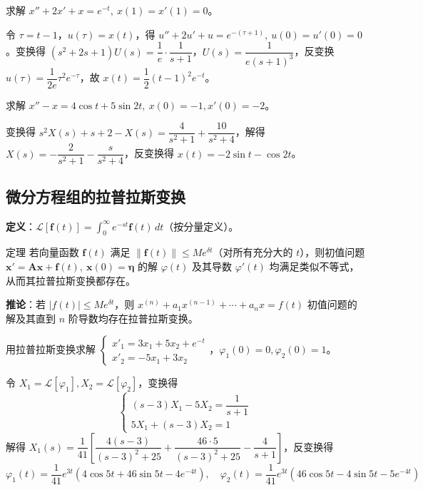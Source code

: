\begin{example}
求解 $x'' + 2x' + x = e^{-t}, \ x(1) = x'(1) = 0$。
\end{example}

\begin{solution}
令 $\tau = t - 1$，$u(\tau) = x(t)$，得 $u'' + 2u' + u = e^{-(\tau+1)}, \ u(0) = u'(0) = 0$。变换得 $(s^2+2s+1)U(s) = \dfrac{1}{e}\cdot\dfrac{1}{s+1}$，$U(s) = \dfrac{1}{e(s+1)^3}$，反变换 $u(\tau) = \dfrac{1}{2e}\tau^2e^{-\tau}$，故 $x(t) = \dfrac{1}{2}(t-1)^2e^{-t}$。
\end{solution}

\begin{example}
求解 $x'' - x = 4\cos t + 5\sin 2t, \ x(0) = -1, x'(0) = -2$。
\end{example}

\begin{solution}
变换得 $s^2X(s) + s + 2 - X(s) = \dfrac{4}{s^2+1} + \dfrac{10}{s^2+4}$，解得 $X(s) = -\dfrac{2}{s^2+1} - \dfrac{s}{s^2+4}$，反变换得 $x(t) = -2\sin t - \cos 2t$。
\end{solution}

\subsection{微分方程组的拉普拉斯变换}

\textbf{定义}：$\mathcal{L}[\mathbf{f}(t)] = \int_0^{\infty} e^{-st}\mathbf{f}(t)\,dt$（按分量定义）。

\begin{myTheorem}{定理}
若向量函数 $\mathbf{f}(t)$ 满足 $\|\mathbf{f}(t)\| \le Me^{\delta t}$（对所有充分大的 $t$），则初值问题 $\mathbf{x}' = \mathbf{A}\mathbf{x} + \mathbf{f}(t), \ \mathbf{x}(0) = \boldsymbol{\eta}$ 的解 $\varphi(t)$ 及其导数 $\varphi'(t)$ 均满足类似不等式，从而其拉普拉斯变换都存在。
\end{myTheorem}

\textbf{推论}：若 $|f(t)| \le Me^{\delta t}$，则 $x^{(n)} + a_1x^{(n-1)} + \cdots + a_nx = f(t)$ 初值问题的解及其直到 $n$ 阶导数均存在拉普拉斯变换。

\begin{example}
用拉普拉斯变换求解 $\begin{cases} x'_1 = 3x_1 + 5x_2 + e^{-t} \\ x'_2 = -5x_1 + 3x_2 \end{cases}$，$\varphi_1(0) = 0, \varphi_2(0) = 1$。
\end{example}

\begin{solution}
令 $X_1 = \mathcal{L}[\varphi_1], X_2 = \mathcal{L}[\varphi_2]$，变换得
$$\begin{cases} (s-3)X_1 - 5X_2 = \dfrac{1}{s+1} \\ 5X_1 + (s-3)X_2 = 1 \end{cases}$$
解得 $X_1(s) = \dfrac{1}{41}\left[\dfrac{4(s-3)}{(s-3)^2+25} + \dfrac{46\cdot 5}{(s-3)^2+25} - \dfrac{4}{s+1}\right]$，反变换得
$$\varphi_1(t) = \frac{1}{41}e^{3t}(4\cos 5t + 46\sin 5t - 4e^{-4t}), \quad \varphi_2(t) = \frac{1}{41}e^{3t}(46\cos 5t - 4\sin 5t - 5e^{-4t})$$
\end{solution}

